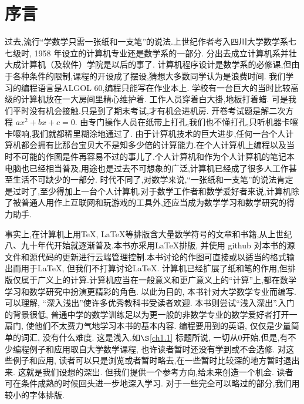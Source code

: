\chapter*{序\quad 言}

\setcounter{page}{1}
\thispagestyle{empty}

过去,流行“学数学只需一张纸和一支笔”的说法.上世纪作者考入四川大学数学系七七级时,
1958 年设立的计算机专业还是数学系的一部分.
分出去成立计算机系并壮大成计算机（及软件）学院是以后的事了.
计算机程序设计是数学系的必修课,但由于各种条件的限制,课程的开设成了摆设,猜想大多数同学认为是浪费时间.
我们学习的编程语言是ALGOL 60,编程只能写在作业本上.
学校有一台巨大的当时比较高级的计算机放在一大房间里精心维护着.
工作人员穿着白大掛,地板打着蜡.
可是我们平时没有机会接触.只是到了期末考试,才有机会进机房.
开卷考试题是解二次方程 $ax^2+bx+c = 0$.
由专门操作人员在纸带上打孔,我们也不懂打孔,只听机器卡嚓卡嚓响,我们就都稀里糊涂地通过了.
由于计算机技术的巨大进步,任何一台个人计算机都会拥有比那台宝贝大不是知多少倍的计算能力.在个人计算机上编程以及当时不可能的作图是件再容易不过的事儿了.个人计算机和作为个人计算机的笔记本电脑也已经相当普及,用途也是过去不可想象的广泛,计算机已经成了很多人工作甚至生活不可缺少的一部分.
时代不同了,对数学来说,“一张纸和一支笔”的说法肯定是过时了,至少得加上一台个人计算机.对于数学工作者和数学爱好者来说,计算机除了被普通人用作上互联网和玩游戏的工具外,还应当成为数学学习和数学研究的得力助手.

事实上,在计算机上用\TeX,  \LaTeX 等排版含大量数学符号的文章和书籍,从上世纪八、九十年代开始就逐渐普及.本书亦采用\LaTeX 排版, 并使用 github 对本书的源文件和源代码的更新进行云端管理控制.本书讨论的作图可直接或以适当的格式输出而用于\LaTeX, 但我们不打算讨论\LaTeX.
计算机已经扩展了纸和笔的作用,但排版仅属于广义上的计算.计算机应当在一般意义和更广意义上的“计算”上,都在数学学习和数学研究中扮演更精彩的角色.
以此为目的, 本书针对大学数学专业而编写.
可以理解, “深入浅出”使许多优秀教科书受读者欢迎. 
本书则尝试“浅入深出”.入门的背景很低,
普通中学的数学训练足以为更一般的非数学专业的数学爱好者打开一扇门, 使他们不太费力气地学习本书的基本内容. 编程要用到的英语, 仅仅是少量简单的词汇, 没有什么难度.
这是浅入.如$\S$\ref{ch1.1} 标题所说, 一切从0开始.但是,有不少编程例子和应用取自大学数学课程, 也许读者暂时还没有学到或不会选修. 对这些例子和应用,
读者可以只是浏览或者暂时略去,在一些暂时比较深的地方暂时退出来.
这就是我们设想的深出.
但我们提供一个参考方向,给未来创造一个机会.
读者可在条件成熟的时候回头进一步地深入学习.
对于一些完全可以略过的部分,我们用较小的字体排版.

